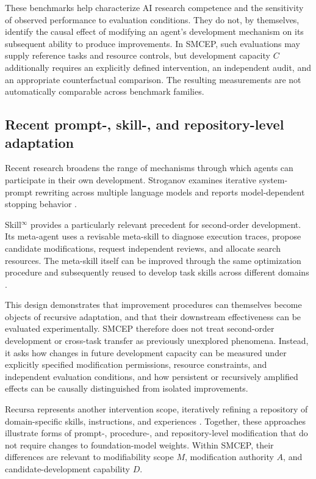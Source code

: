 \documentclass[11pt,a4paper]{article}
\begin{document}
These benchmarks help characterize AI research competence and the sensitivity of observed performance
to evaluation conditions. They do not, by themselves, identify the causal effect of modifying an agent's
development mechanism on its subsequent ability to produce improvements. In SMCEP, such evaluations
may supply reference tasks and resource controls, but development capacity $C$ additionally requires
an explicitly defined intervention, an independent audit, and an appropriate counterfactual comparison.
The resulting measurements are not automatically comparable across benchmark families.

\subsection{Recent prompt-, skill-, and repository-level adaptation}

Recent research broadens the range of mechanisms through which agents can participate in their own development. Stroganov examines iterative system-prompt rewriting across multiple language models and reports model-dependent stopping behavior \cite{stroganov2026}.

Skill$^{\infty}$ provides a particularly relevant precedent for second-order development. Its meta-agent
uses a revisable meta-skill to diagnose execution traces, propose candidate modifications, request
independent reviews, and allocate search resources. The meta-skill itself can be improved through the
same optimization procedure and subsequently reused to develop task skills across different domains \cite{tao2026skill}.

This design demonstrates that improvement procedures can themselves become objects of recursive adaptation, and that their downstream effectiveness can be evaluated experimentally. SMCEP therefore does not treat second-order development or cross-task transfer as previously unexplored phenomena. Instead, it asks how changes in future development capacity can be measured under explicitly specified modification permissions, resource constraints, and independent evaluation conditions, and how persistent or recursively amplified effects can be causally distinguished from isolated improvements.

Recursa represents another intervention scope, iteratively refining a repository of domain-specific
skills, instructions, and experiences \cite{zhu2026recursa}. Together, these approaches illustrate forms of prompt-, procedure-, and repository-level modification that do not require changes to foundation-model weights. Within SMCEP, their differences are relevant to modifiability scope $M$, modification authority $A$, and candidate-development capability $D$.
\end{document}
